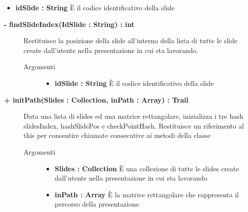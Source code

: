 \begin{description}
\begin{description}
\begin{description}
\begin{itemize}
					\item \textbf{idSlide : String		} \hfill
					È il codice identificativo della slide 
					
				\end{itemize}
			
		\end{description}
	\end{description}
	
	\begin{description}
		\item[\textbf{\color{blue}- findSlideIndex(IdSlide : String) : int			}] \hfill
			Restituisce la posizione della slide all'interno della lista di tutte le slide create dall'utente nella presentazione in cui sta lavorando.
			
		\begin{description}
			\item[Argomenti] \hfill
				\begin{itemize}
				
					\item \textbf{idSlide : String		} \hfill
					È il codice identificativo della slide 
					
				\end{itemize}
			
		\end{description}
	\end{description}
	
	\begin{description}
		\item[\textbf{\color{blue}+ initPath(Slides : Collection, inPath : Array) : Trail			}] \hfill
			Data una lista di slides ed una matrice rettangolare, inizializza i tre hash slidesIndex, hashSlidePos e checkPointHash.  Restituisce un riferimento al this per consentire chiamate consecutive ai metodi della classe
			
		\begin{description}
			\item[Argomenti] \hfill
				\begin{itemize}
				
					\item \textbf{Slides : Collection		} \hfill
					È una collezione di tutte le slides create dall'utente nella presentazione in cui sta lavorando
					\item \textbf{inPath :  Array		} \hfill
					È la matrice rettangolare che rappresenta il percorso della presentazione
					

\end{itemize}
\end{description}
\end{description}
\end{description}
